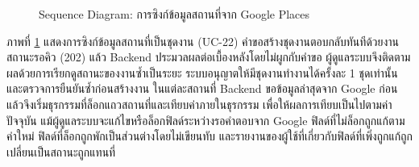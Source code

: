 \begin{figure}[H]
\centering
{}
\caption{Sequence Diagram: การซิงก์ข้อมูลสถานที่จาก Google Places}
\label{fig:sequence_place_sync}
\end{figure}

ภาพที่ \ref{fig:sequence_place_sync} แสดงการซิงก์ข้อมูลสถานที่เป็นชุดงาน (UC-22) คำขอสร้างชุดงานตอบกลับทันทีด้วยงานสถานะรอคิว (202) แล้ว Backend ประมวลผลต่อเบื้องหลังโดยไม่ผูกกับคำขอ ผู้ดูแลระบบจึงติดตามผลด้วยการเรียกดูสถานะของงานซ้ำเป็นระยะ ระบบอนุญาตให้มีชุดงานทำงานได้ครั้งละ 1 ชุดเท่านั้น และตรวจการยืนยันซ้ำก่อนสร้างงาน ในแต่ละสถานที่ Backend ขอข้อมูลล่าสุดจาก Google ก่อนแล้วจึงเริ่มธุรกรรมที่ล็อกแถวสถานที่และเทียบค่าภายในธุรกรรม เพื่อให้ผลการเทียบเป็นไปตามค่าปัจจุบัน แม้ผู้ดูแลระบบจะแก้ไขหรือล็อกฟิลด์ระหว่างรอคำตอบจาก Google ฟิลด์ที่ไม่ล็อกถูกแก้ตามค่าใหม่ ฟิลด์ที่ล็อกถูกพักเป็นส่วนต่างโดยไม่เขียนทับ และรายงานของผู้ใช้ที่เกี่ยวกับฟิลด์ที่เพิ่งถูกแก้ถูกเปลี่ยนเป็นสถานะถูกแทนที่

